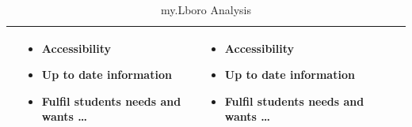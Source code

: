 \documentclass{article}
\begin{document}
\begin{table}[htb]
\begin{tabular}{  c | m{3cm} | m{3cm} | m{3cm} | m{1cm} }
    & 

      \begin{itemize}
        \item Accessibility
        \item Up to date information
        \item Fulfil students needs and wants \ldots
      \end{itemize}
    &

	 \begin{itemize}
        \item Accessibility
        \item Up to date information
        \item Fulfil students needs and wants \ldots
      \end{itemize} 


    \\ \hline
  \end{tabular}
  \caption{my.Lboro Analysis}\label{tbl:myLboro}

\end{table}
\end{document}
